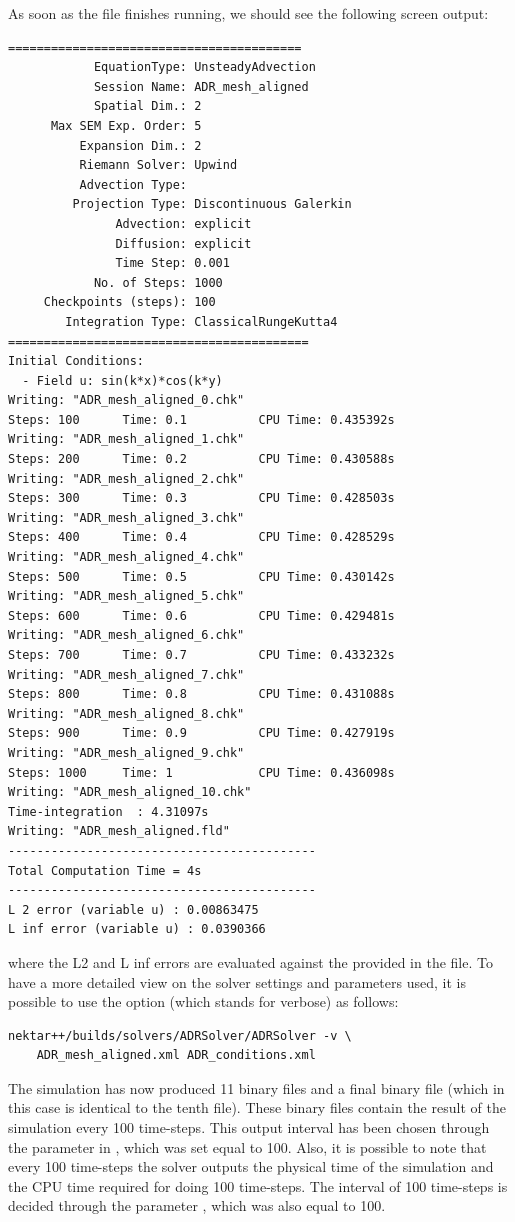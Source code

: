 As soon as the file finishes running, we should see the following screen output:
%
\begin{lstlisting}[style=BashInputStyle]
=========================================
	        EquationType: UnsteadyAdvection
	        Session Name: ADR_mesh_aligned
	        Spatial Dim.: 2
	  Max SEM Exp. Order: 5
	      Expansion Dim.: 2
	      Riemann Solver: Upwind
	      Advection Type: 
	     Projection Type: Discontinuous Galerkin
	           Advection: explicit
	           Diffusion: explicit
	           Time Step: 0.001
	        No. of Steps: 1000
	 Checkpoints (steps): 100
	    Integration Type: ClassicalRungeKutta4
==========================================
Initial Conditions:
  - Field u: sin(k*x)*cos(k*y)
Writing: "ADR_mesh_aligned_0.chk"
Steps: 100      Time: 0.1          CPU Time: 0.435392s
Writing: "ADR_mesh_aligned_1.chk"
Steps: 200      Time: 0.2          CPU Time: 0.430588s
Writing: "ADR_mesh_aligned_2.chk"
Steps: 300      Time: 0.3          CPU Time: 0.428503s
Writing: "ADR_mesh_aligned_3.chk"
Steps: 400      Time: 0.4          CPU Time: 0.428529s
Writing: "ADR_mesh_aligned_4.chk"
Steps: 500      Time: 0.5          CPU Time: 0.430142s
Writing: "ADR_mesh_aligned_5.chk"
Steps: 600      Time: 0.6          CPU Time: 0.429481s
Writing: "ADR_mesh_aligned_6.chk"
Steps: 700      Time: 0.7          CPU Time: 0.433232s
Writing: "ADR_mesh_aligned_7.chk"
Steps: 800      Time: 0.8          CPU Time: 0.431088s
Writing: "ADR_mesh_aligned_8.chk"
Steps: 900      Time: 0.9          CPU Time: 0.427919s
Writing: "ADR_mesh_aligned_9.chk"
Steps: 1000     Time: 1            CPU Time: 0.436098s
Writing: "ADR_mesh_aligned_10.chk"
Time-integration  : 4.31097s
Writing: "ADR_mesh_aligned.fld"
-------------------------------------------
Total Computation Time = 4s
-------------------------------------------
L 2 error (variable u) : 0.00863475
L inf error (variable u) : 0.0390366
\end{lstlisting}
%
where the L2 and L inf errors are evaluated against the  
provided in the  file. To have a more detailed view on the solver settings
and parameters used, it is possible to use the  option (which stands for verbose) as follows:
%
\begin{lstlisting}[style=BashInputStyle]
nektar++/builds/solvers/ADRSolver/ADRSolver -v \
    ADR_mesh_aligned.xml ADR_conditions.xml
\end{lstlisting}
%
The simulation has now produced 11  binary files and a final  binary file (which 
in this case is identical to the tenth \inltt{.chk} file). These binary files contain the result of the simulation
every 100 time-steps. This output interval has been chosen through the parameter \inltt{IO\_CheckSteps} 
in \inlsh{ADR\_conditions.xml}, which was set equal to 100. Also, it is possible to note that every 100 
time-steps the solver outputs the physical time of the simulation and the CPU time required for doing 
100 time-steps. The interval of 100 time-steps is decided through the parameter \inltt{IO\_InfoSteps}, 
which was also equal to 100.



